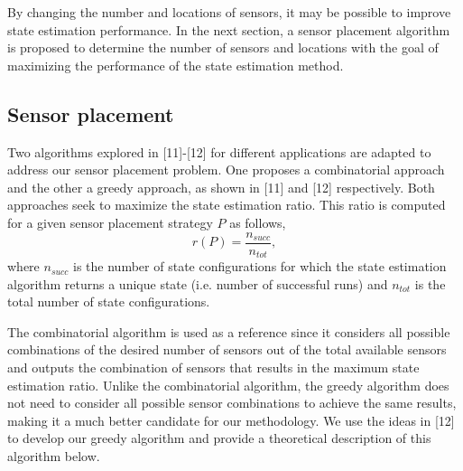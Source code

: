 \documentclass[journal]{IEEEtran}
\begin{document}
By changing the number and locations of sensors, it may be possible to improve state estimation performance. In the next section, a sensor placement algorithm is proposed to determine the number of sensors and locations with the goal of maximizing the performance of the state estimation method.


\subsection{Sensor placement} 
Two algorithms explored in [11]-[12] for different applications are adapted to address our sensor placement problem. One proposes a combinatorial approach and the other a greedy approach, as shown in [11] and [12] respectively. Both approaches seek to maximize the state estimation ratio. This ratio is computed for a given sensor placement strategy $P$ as follows,
\begin{equation}r(P) = \frac{n_{succ}}{n_{tot}},\end{equation}
where $n_{succ}$ is the number of state configurations for which the state estimation algorithm returns a unique state (i.e. number of successful runs) and $n_{tot}$ is the total number of state configurations. 

The combinatorial algorithm is used as a reference since it considers all possible combinations of the desired number of sensors out of the total available sensors and outputs the combination of sensors that results in the maximum state estimation ratio. Unlike the combinatorial algorithm, the greedy algorithm does not need to consider all possible sensor combinations to achieve the same results, making it a much better candidate for our methodology. We use the ideas in [12] to develop our greedy algorithm and provide a theoretical description of this algorithm below. 
\end{document}
